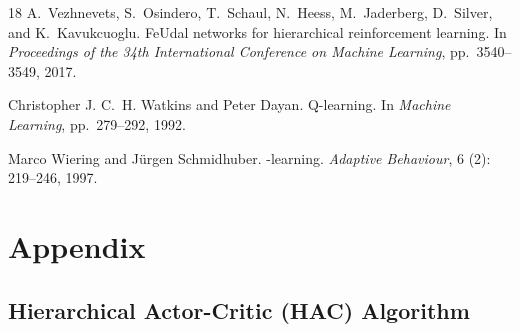 \documentclass{article} %
\begin{document}
\begin{thebibliography}{18}
A.~Vezhnevets, S.~Osindero, T.~Schaul, N.~Heess, M.~Jaderberg, D.~Silver, and
  K.~Kavukcuoglu.
\newblock Fe{U}dal networks for hierarchical reinforcement learning.
\newblock In \emph{Proceedings of the 34th International Conference on Machine
  Learning}, pp.\  3540--3549, 2017.

Christopher J. C.~H. Watkins and Peter Dayan.
\newblock Q-learning.
\newblock In \emph{Machine Learning}, pp.\  279--292, 1992.

Marco Wiering and J{\"{u}}rgen Schmidhuber.
-learning.
\newblock \emph{Adaptive Behaviour}, 6 (2): 219--246, 1997.

\end{thebibliography}


\section{Appendix}

\subsection{Hierarchical Actor-Critic (HAC) Algorithm}
\end{document}
